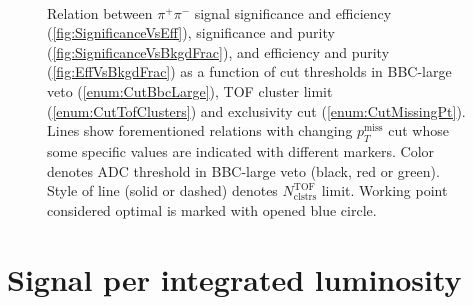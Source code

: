 \begin{figure}[hb]
{\begin{subfigure}[b]{\linewidth}
  \end{subfigure}\\
  \begin{minipage}[t][1.042\linewidth][t]{\linewidth}\vspace{10pt}
    \caption[Relation between $\pi^{+}\pi^{-}$ significance, efficiency and purity vs. thresholds in cuts~\ref{enum:CutBbcLarge}, \ref{enum:CutTofClusters} and \ref{enum:CutMissingPt}]{Relation between $\pi^{+}\pi^{-}$ signal significance and efficiency (\ref{fig:SignificanceVsEff}), significance and purity (\ref{fig:SignificanceVsBkgdFrac}), and efficiency and purity (\ref{fig:EffVsBkgdFrac}) as a function of cut thresholds in BBC-large veto (\ref{enum:CutBbcLarge}), TOF cluster limit (\ref{enum:CutTofClusters}) and exclusivity cut (\ref{enum:CutMissingPt}). Lines show forementioned relations with changing $p_{T}^\textrm{miss}$ cut whose some specific values are indicated with different markers. Color denotes ADC threshold in BBC-large veto (black, red or green). Style of line (solid or dashed) denotes $N^{\textrm{TOF}}_{\textrm{clstrs}}$ limit. Working point considered optimal is marked with opened blue circle.}\label{fig:workingPoint}
  \end{minipage}
}%

\end{figure}


\section{Signal per integrated luminosity}

